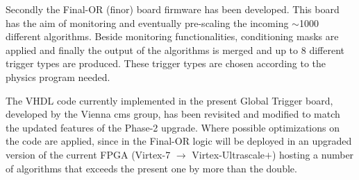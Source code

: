 \documentclass[../../main.tex]{subfiles}
\begin{document}
Secondly the Final-OR (finor) board firmware has been developed. This board has the aim of monitoring and eventually pre-scaling the incoming $\sim$1000 different algorithms. Beside monitoring functionalities, conditioning masks are applied and finally the output of the algorithms is merged and up to 8 different trigger types are produced. These trigger types are chosen according to the physics program needed.  
    
The VHDL code currently implemented in the present Global Trigger board, developed by the Vienna \acrshort{cms} group, has been revisited and modified to match the updated features of the Phase-2 upgrade. Where possible optimizations on the code are applied, since in the Final-OR logic will be deployed in an upgraded version of the current FPGA (Virtex-7 $\to$ Virtex-Ultrascale$+$) hosting a number of algorithms that exceeds the present one by more than the double.  
    
    
    



    
\end{document}
